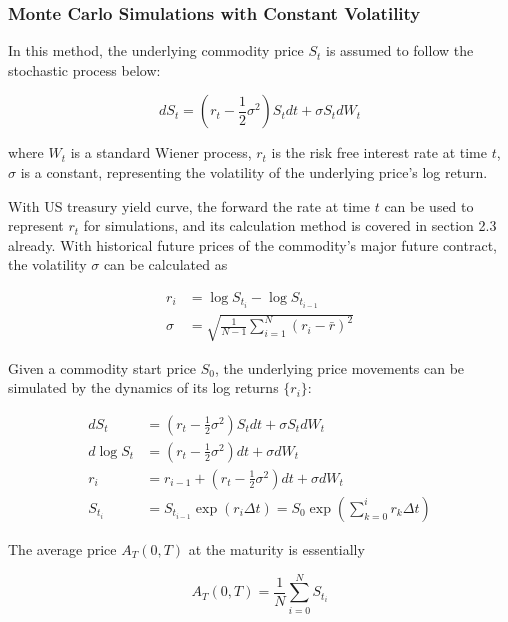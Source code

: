 \documentclass[10pt, a4paper, twocolumn]{article} %
\begin{document}
\subsubsection{Monte Carlo Simulations with Constant Volatility}

In this method, the underlying commodity price $S_t$ is assumed to follow the stochastic process below:

\begin{equation} \label {eq:5}
dS_t = (r_t - \frac 12 \sigma^2)S_t dt + \sigma S_t dW_t
\end{equation}

where $W_t$ is a standard Wiener process, $r_t$ is the risk free interest rate at time $t$, $\sigma$ is a constant, representing the volatility of the underlying price's log return.

With US treasury yield curve, the forward the rate at time $t$ can be used to represent $r_t$ for simulations, and its calculation method is covered in section 2.3 already. With historical future prices of the commodity's major future contract, the volatility $\sigma$ can be calculated as

\begin{equation} \label{eq:6}
\begin{aligned}
r_i &= \log S_{t_i} - \log S_{t_{i-1}}
\\
\sigma &= \sqrt {\frac 1{N-1} \sum_{i=1}^N (r_i - \bar r)^2}
\end{aligned}
\end{equation}

Given a commodity start price $S_0$, the underlying price movements can be simulated by the dynamics of its log returns $\{r_i\}$:

\begin{equation} \label{eq:mcpricing}
\begin{aligned}
dS_t &= (r_t - \frac 12 \sigma^2)S_t dt + \sigma S_t dW_t
\\
d\log S_t &= (r_t - \frac 12 \sigma^2) dt + \sigma dW_t
\\
r_i &= r_{i-1} + (r_t - \frac 12 \sigma^2) dt + \sigma dW_t
\\
S_{t_i} &=S_{t_{i-1}}\exp(r_i \Delta t) = S_0\exp(\sum_{k=0}^i r_k \Delta t)
\end{aligned}
\end{equation}

The average price $A_T(0,T)$ at the maturity is essentially

\[ A_T(0,T) = \frac 1N \sum_{i=0}^N S_{t_i}\]
\end{document}
